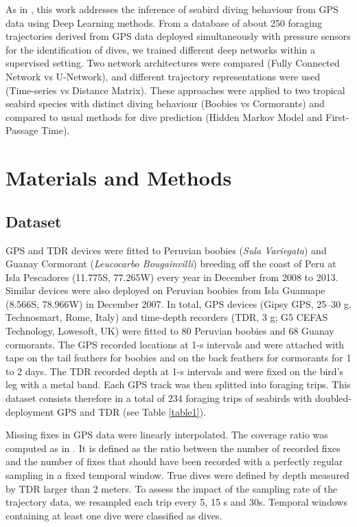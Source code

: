\documentclass{article}
\begin{document}
As in \citep{browning_predicting_2018}, this work addresses the inference of seabird diving behaviour from GPS data using Deep Learning methods. From a database of about 250 foraging trajectories derived from GPS data deployed simultaneously with pressure sensors for the identification of dives, we trained different deep networks within a supervised setting. Two network architectures were compared (Fully Connected Network vs U-Network), and different trajectory representations were used (Time-series vs Distance Matrix). These approaches were applied to two tropical seabird species with distinct diving behaviour (Boobies vs Cormorants) and compared to usual methods for dive prediction (Hidden Markov Model and First-Passage Time).


\section{Materials and Methods}
\subsection{Dataset}

GPS and TDR devices were fitted to Peruvian boobies (\textit{Sula Variegata}) and Guanay Cormorant (\textit{Leucocarbo Bougainvilli}) breeding off the coast of Peru at Isla Pescadores (11.775\degree S, 77.265\degree W) every year in December from 2008 to 2013. Similar devices were also deployed on Peruvian boobies from Isla Guanuape (8.566\degree S, 78.966\degree W) in December 2007.
In total, GPS devices (Gipsy GPS, 25–30 g, Technosmart, Rome, Italy) and time-depth recorders (TDR, 3 g; G5 CEFAS Technology, Lowesoft, UK) were fitted to 80 Peruvian boobies and 68 Guanay cormorants. The GPS recorded locations at 1-s intervals and were attached with tape on the tail feathers for boobies and on the back feathers for cormorants for 1 to 2 days. The TDR recorded depth at 1-s intervals and were fixed on the bird's leg with a metal band. Each GPS track was then splitted into foraging trips. This dataset consists therefore in a total of 234 foraging trips of seabirds with doubled-deployment GPS and TDR (see Table \ref{table1}).

Missing fixes in GPS data were linearly interpolated. 
The coverage ratio was computed as in \citep{browning_predicting_2018}. 
It is defined as the ratio between the number of recorded fixes and the number of fixes that should have been recorded with a perfectly regular sampling in a fixed temporal window.
True dives were defined by depth measured by TDR larger than 2 meters. To assess the impact of the sampling rate of the trajectory data, we resampled each trip every 5, 15 s and 30s. Temporal windows containing at least one dive were classified as dives.
\end{document}
